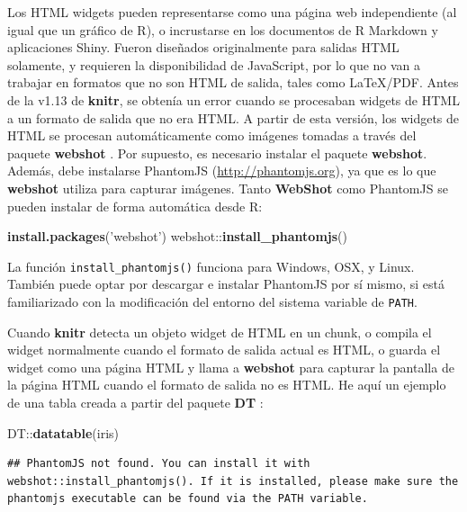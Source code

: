 \documentclass[12pt,]{krantz}
\makeatletter
\newenvironment{Shaded}{\begin{snugshade}}{\end{snugshade}}
\newcommand{\KeywordTok}[1]{\textcolor[rgb]{0.13,0.29,0.53}{\textbf{{#1}}}}
\newcommand{\StringTok}[1]{\textcolor[rgb]{0.31,0.60,0.02}{{#1}}}
\newcommand{\NormalTok}[1]{{#1}}
\newenvironment{kframe}{%
\medskip{}
\setlength{\fboxsep}{.8em}
 \def\at@end@of@kframe{}%
 \ifinner\ifhmode%
  \def\at@end@of@kframe{\end{minipage}}%
  \begin{minipage}{\columnwidth}%
 \fi\fi%
 \def\FrameCommand##1{\hskip\@totalleftmargin \hskip-\fboxsep
 \colorbox{shadecolor}{##1}\hskip-\fboxsep
     \hskip-\linewidth \hskip-\@totalleftmargin \hskip\columnwidth}%
 \MakeFramed {\advance\hsize-\width
   \@totalleftmargin\z@ \linewidth\hsize
   \@setminipage}}%
 {\par\unskip\endMakeFramed%
 \at@end@of@kframe}
\renewenvironment{Shaded}{\begin{kframe}}{\end{kframe}}
\theoremstyle{definition}
\theoremstyle{definition}
\theoremstyle{remark}
\makeatother
\begin{document}
Los HTML widgets pueden representarse como una página web independiente
(al igual que un gráfico de R), o incrustarse en los documentos de R
Markdown y aplicaciones Shiny. Fueron diseñados originalmente para
salidas HTML solamente, y requieren la disponibilidad de JavaScript, por
lo que no van a trabajar en formatos que no son HTML de salida, tales
como LaTeX/PDF. Antes de la v1.13 de \textbf{knitr}, se obtenía un error
cuando se procesaban widgets de HTML a un formato de salida que no era
HTML. A partir de esta versión, los widgets de HTML se procesan
automáticamente como imágenes tomadas a través del paquete
\textbf{webshot} \citep{R-webshot}. Por supuesto, es necesario instalar
el paquete \textbf{webshot}. Además, debe instalarse PhantomJS
(\url{http://phantomjs.org}), ya que es lo que \textbf{webshot} utiliza
para capturar imágenes. Tanto \textbf{WebShot} como PhantomJS se pueden
instalar de forma automática desde R:

\begin{Shaded}
\begin{Highlighting}[]
\KeywordTok{install.packages}\NormalTok{(}\StringTok{'webshot'}\NormalTok{)}
\NormalTok{webshot::}\KeywordTok{install_phantomjs}\NormalTok{()}
\end{Highlighting}
\end{Shaded}

La función \texttt{install\_phantomjs()} funciona para Windows, OSX, y
Linux. También puede optar por descargar e instalar PhantomJS por sí
mismo, si está familiarizado con la modificación del entorno del sistema
variable de \texttt{PATH}.

Cuando \textbf{knitr} detecta un objeto widget de HTML en un chunk, o
compila el widget normalmente cuando el formato de salida actual es
HTML, o guarda el widget como una página HTML y llama a \textbf{webshot}
para capturar la pantalla de la página HTML cuando el formato de salida
no es HTML. He aquí un ejemplo de una tabla creada a partir del paquete
\textbf{DT} \citep{R-DT}:

\begin{Shaded}
\begin{Highlighting}[]
\NormalTok{DT::}\KeywordTok{datatable}\NormalTok{(iris)}
\end{Highlighting}
\end{Shaded}

\begin{verbatim}
## PhantomJS not found. You can install it with webshot::install_phantomjs(). If it is installed, please make sure the phantomjs executable can be found via the PATH variable.
\end{verbatim}
\end{document}
